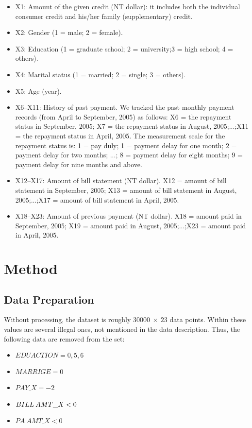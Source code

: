 \documentclass[a4paper,11pt,twocolumn]{article}
\begin{document}
\begin{itemize}
\item X1: Amount of the given credit (NT dollar): it includes both the individual consumer credit and his/her family (supplementary) credit.
\item X2: Gender (1 = male; 2 = female).
\item X3: Education (1 = graduate school; 2 = university;3 = high school; 4 = others).
\item X4: Marital status (1 = married; 2 = single; 3 = others).
\item X5: Age (year).
\item X6–X11: History of past payment. We tracked the past monthly payment records (from April to September,
2005) as follows: X6 = the repayment status in September, 2005; X7 = the repayment status in August,
2005;...;X11 = the repayment status in April, 2005.
The measurement scale for the repayment status is:
1 = pay duly; 1 = payment delay for one month;
2 = payment delay for two months; ...; 8 = payment
delay for eight months; 9 = payment delay for nine
months and above.
\item X12–X17: Amount of bill statement (NT dollar).
X12 = amount of bill statement in September, 2005;
X13 = amount of bill statement in August,
2005;...;X17 = amount of bill statement in April, 2005. 
\item X18–X23: Amount of previous payment (NT dollar).
X18 = amount paid in September, 2005; X19 = amount
paid in August, 2005;...;X23 = amount paid in April,
2005.
\end{itemize}


\section{Method}

\subsection{Data Preparation} 
Without processing, the dataset is roughly $30000\: \times\: 23$ data points. Within these values are several illegal ones, not mentioned in the data description. Thus, the following data are removed from the set:
\begin{itemize}
\item[] $EDUACTION = 0,5,6$
\item[] $MARRIGE = 0$
\item[] $PAY\_X = -2$
\item[] $BILL\:AMT\text\_X < 0$
\item[] $PA\:AMT\_X < 0$
\end{itemize}
\end{document}
